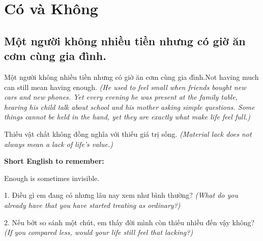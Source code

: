 \chapter{Có và Không}

\section{Một người không nhiều tiền nhưng có giờ ăn cơm cùng gia đình.}
\begin{truyen}{Một người không nhiều tiền nhưng có giờ ăn cơm cùng gia đình.}{Not having much can still mean having enough.}
\textit{(He used to feel small when friends bought new cars and new phones. Yet every evening he was present at the family table, hearing his child talk about school and his mother asking simple questions. Some things cannot be held in the hand, yet they are exactly what make life feel full.)}
\end{truyen}
\begin{baihoc}
Thiếu vật chất không đồng nghĩa với thiếu giá trị sống.
\textit{(Material lack does not always mean a lack of life's value.)}
\end{baihoc}
\begin{ghinhoanh}
\textbf{Short English to remember:}

Enough is sometimes invisible.
\end{ghinhoanh}
\begin{tuhocnhanh}
1. Điều gì em đang có nhưng lâu nay xem như bình thường? \textit{(What do you already have that you have started treating as ordinary?)}

2. Nếu bớt so sánh một chút, em thấy đời mình còn thiếu nhiều đến vậy không? \textit{(If you compared less, would your life still feel that lacking?)}
\end{tuhocnhanh}
\ngancach

